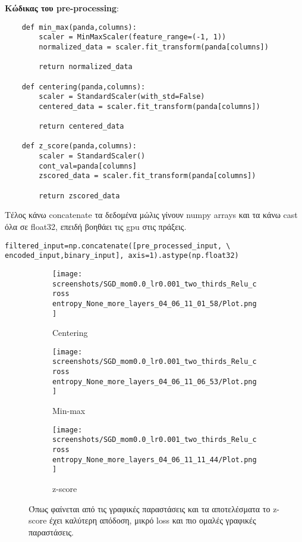 \documentclass[a4paper,11pt]{article}
\begin{document}
\newpage
\noindent
\textbf{Κώδικας του pre-processing}:
\begin{verbatim}
    def min_max(panda,columns):
        scaler = MinMaxScaler(feature_range=(-1, 1))
        normalized_data = scaler.fit_transform(panda[columns])

        return normalized_data

    def centering(panda,columns):
        scaler = StandardScaler(with_std=False)  
        centered_data = scaler.fit_transform(panda[columns])

        return centered_data

    def z_score(panda,columns):
        scaler = StandardScaler()  
        cont_val=panda[columns]
        zscored_data = scaler.fit_transform(panda[columns])

        return zscored_data
    \end{verbatim}
    

Τέλος κάνω concatenate τα δεδομένα μώλις γίνουν numpy arrays και τα κάνω cast όλα σε float32, επειδή 
βοηθάει τις gpu στις πράξεις.

\begin{verbatim}
filtered_input=np.concatenate([pre_processed_input, \
encoded_input,binary_input], axis=1).astype(np.float32)
    \end{verbatim}

    \begin{figure}[H]
      \centering
      \begin{subfigure}{0.70\textwidth}
        \texttt{[image: screenshots/SGD\_mom0.0\_lr0.001\_two\_thirds\_Relu\_cross entropy\_None\_more\_layers\_04\_06\_11\_01\_58/Plot.png]}
        \caption{Centering}
        \label{fig:sub1}
      \end{subfigure}
      \quad
      \begin{subfigure}{0.70\textwidth}
        \texttt{[image: screenshots/SGD\_mom0.0\_lr0.001\_two\_thirds\_Relu\_cross entropy\_None\_more\_layers\_04\_06\_11\_06\_53/Plot.png]}
        \caption{Min-max}
        \label{fig:sub2}
      \end{subfigure}
      \begin{subfigure}{0.70\textwidth}
        \texttt{[image: screenshots/SGD\_mom0.0\_lr0.001\_two\_thirds\_Relu\_cross entropy\_None\_more\_layers\_04\_06\_11\_11\_44/Plot.png]}
        \caption{z-score}
        \label{fig:sub2}
      \end{subfigure}
      \caption{Όπως φαίνεται από τις γραφικές παραστάσεις και τα αποτελέσματα το z-score έχει καλύτερη απόδοση, μικρό loss και πιο ομαλές γραφικές παραστάσεις.}
      \label{fig:two_plots}
    \end{figure}
    
\end{document}
